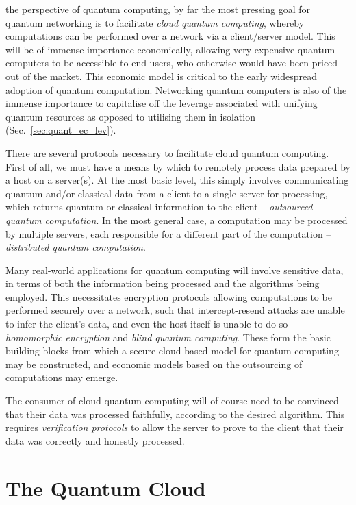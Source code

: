  the perspective of quantum computing, by far the most pressing goal for quantum networking is to facilitate \textit{cloud quantum computing}, whereby computations can be performed over a network via a client/server model. This will be of immense importance economically, allowing very expensive quantum computers to be accessible to end-users, who otherwise would have been priced out of the market. This economic model is critical to the early widespread adoption of quantum computation. Networking quantum computers is also of the immense importance to capitalise off the leverage associated with unifying quantum resources as opposed to utilising them in isolation (Sec.~\ref{sec:quant_ec_lev}).

There are several protocols necessary to facilitate cloud quantum computing. First of all, we must have a means by which to remotely process data prepared by a host on a server(s). At the most basic level, this simply involves communicating quantum and/or classical data from a client to a single server for processing, which returns quantum or classical information to the client -- \textit{outsourced quantum computation}. In the most general case, a computation may be processed by multiple servers, each responsible for a different part of the computation -- \textit{distributed quantum computation}.

Many real-world applications for quantum computing will involve sensitive data, in terms of both the information being processed and the algorithms being employed. This necessitates encryption protocols allowing computations to be performed securely over a network, such that intercept-resend attacks are unable to infer the client's data, and even the host itself is unable to do so -- \textit{homomorphic encryption} and \textit{blind quantum computing}. These form the basic building blocks from which a secure cloud-based model for quantum computing may be constructed, and economic models based on the outsourcing of computations may emerge.

The consumer of cloud quantum computing will of course need to be convinced that their data was processed faithfully, according to the desired algorithm. This requires \textit{verification protocols} to allow the server to prove to the client that their data was correctly and honestly processed. 

%
%

\section{The Quantum Cloud\texttrademark} \label{sec:cloud} 

